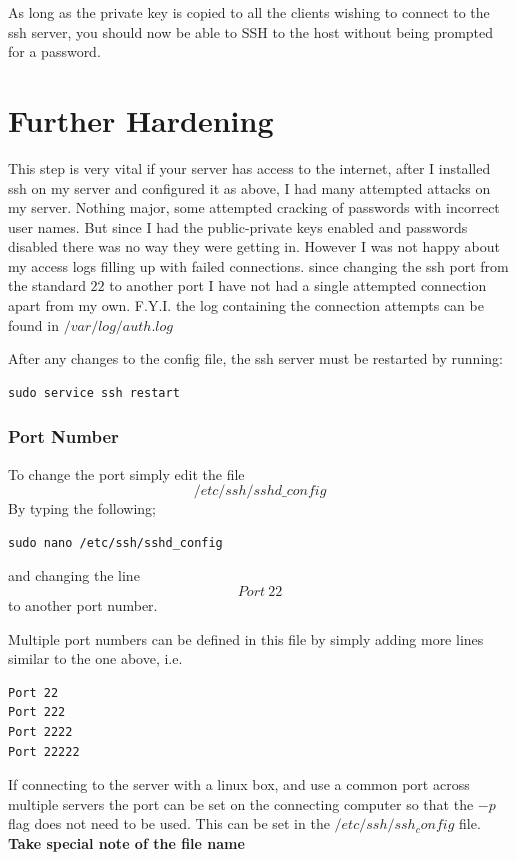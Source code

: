 As long as the private key is copied to all the clients wishing to connect to the ssh server, you should now be able to SSH to the host without being prompted for a password.

\section{Further Hardening}
\label{sec:ssh_hardening}

This step is very vital if your server has access to the internet, after I installed ssh on my server and configured it as above, I had many attempted attacks on my server.  Nothing major, some attempted cracking of passwords with incorrect user names. But since I had the public-private keys enabled and passwords disabled there was no way they were getting in.  However I was not happy about my access logs filling up with failed connections.  since changing the ssh port from the standard $22$ to another port I have not had a single attempted connection apart from my own.  F.Y.I. the log containing the connection attempts can be found in $/var/log/auth.log$

After any changes to the config file, the ssh server must be restarted by running:

\begin{lstlisting}
sudo service ssh restart
\end{lstlisting}

\subsubsection{Port Number}

To change the port simply edit the file $$/etc/ssh/sshd\_config$$ By typing the following;

\begin{lstlisting}
sudo nano /etc/ssh/sshd_config
\end{lstlisting}

and changing the line $$Port\ 22$$ to another port number.

Multiple port numbers can be defined in this file by simply adding more lines similar to the one above, i.e.

\begin{verbatim}
Port 22
Port 222
Port 2222
Port 22222
\end{verbatim}

If connecting to the server with a linux box, and use a common port across multiple servers the port can be set on the connecting computer so that the $-p$ flag does not need to be used.  This can be set in the $/etc/ssh/ssh_config$ file. \textbf{Take special note of the file name}

